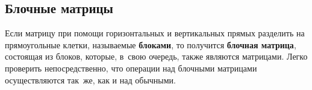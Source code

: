\subsection{Блочные матрицы}
 Если матрицу при помощи горизонтальных и вертикальных прямых разделить на прямоугольные клетки, называемые \textbf{блоками}, то получится \textbf{блочная матрица}, состоящая из блоков, которые, в~свою очередь, также являются матрицами.
Легко проверить непосредственно, что операции над блочными матрицами осуществляются так~же, как и над обычными.